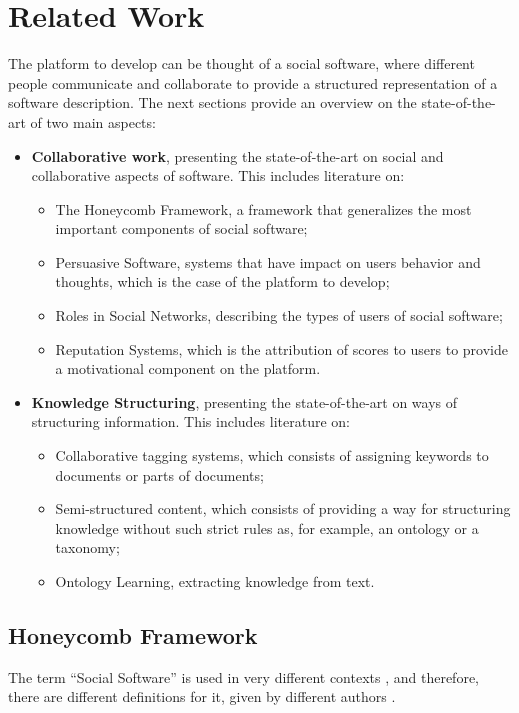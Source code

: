 
\chapter{Related Work}
\label{chapter:relatedwork}
\label{related}
The platform to develop can be thought of a social software, where different people communicate and collaborate to provide a structured representation of a software description.
The next sections provide an overview on the state-of-the-art of two main aspects:
\begin{itemize}
\item \textbf{Collaborative work}, presenting the state-of-the-art on social and collaborative aspects of software. This includes literature on:
	\begin{itemize}
		\item The Honeycomb Framework, a framework that generalizes the most important components of social software;
		\item Persuasive Software, systems that have impact on users behavior and thoughts, which is the case of the platform to develop;
		\item Roles in Social Networks, describing the types of users of social software;
		\item Reputation Systems, which is the attribution of scores to users to provide a motivational component on the platform.
	\end{itemize}
	
\item \textbf{Knowledge Structuring}, presenting the state-of-the-art on ways of structuring information. This includes literature on:
	\begin{itemize}
		\item Collaborative tagging systems, which consists of assigning keywords to documents or parts of documents;
		\item Semi-structured content, which consists of providing a way for structuring knowledge without such strict rules as, for example, an ontology or a taxonomy;
		\item Ontology Learning, extracting knowledge from text.
	\end{itemize} 
\end{itemize}


\section{Honeycomb Framework}
\label{section:relatedWorkHoneycomb}
The term ``Social Software'' is used in very different contexts \cite{pereira2010social}, and therefore, there are different definitions for it, given by different authors \cite{shirky2005group,klamma2007social,kolko2007mobile,wiley2008tagging,chatti2007future}. 

